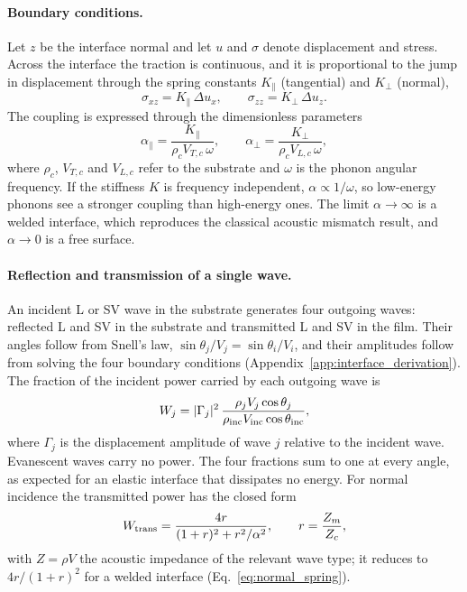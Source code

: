 \paragraph{Boundary conditions.}
Let $z$ be the interface normal and let $u$ and $\sigma$ denote displacement and stress.
Across the interface the traction is continuous, and it is proportional to the jump in
displacement through the spring constants $K_\parallel$ (tangential) and $K_\perp$ (normal),
\begin{equation}
  \sigma_{xz}=K_\parallel\,\Delta u_x,\qquad \sigma_{zz}=K_\perp\,\Delta u_z .
\end{equation}
The coupling is expressed through the dimensionless parameters
\begin{equation}
  \alpha_\parallel=\frac{K_\parallel}{\rho_cV_{T,c}\,\omega},\qquad
  \alpha_\perp=\frac{K_\perp}{\rho_cV_{L,c}\,\omega},
  \label{eq:alpha_omega}
\end{equation}
where $\rho_c$, $V_{T,c}$ and $V_{L,c}$ refer to the substrate and $\omega$ is the phonon
angular frequency. If the stiffness $K$ is frequency independent, $\alpha\propto1/\omega$,
so low-energy phonons see a stronger coupling than high-energy ones. The limit
$\alpha\to\infty$ is a welded interface, which reproduces the classical acoustic mismatch
result, and $\alpha\to0$ is a free surface.

\paragraph{Reflection and transmission of a single wave.}
An incident L or SV wave in the substrate generates four outgoing waves: reflected L and SV
in the substrate and transmitted L and SV in the film. Their angles follow from Snell's law,
$\sin\theta_j/V_j=\sin\theta_i/V_i$, and their amplitudes follow from solving the four
boundary conditions (Appendix~\ref{app:interface_derivation}). The fraction of the incident
power carried by each outgoing wave is
\begin{equation}
  W_j=|\Gamma_j|^2\,\frac{\rho_jV_j\cos\theta_j}{\rho_{\rm inc}V_{\rm inc}\cos\theta_{\rm inc}},
  \label{eq:power_coeff}
\end{equation}
where $\Gamma_j$ is the displacement amplitude of wave $j$ relative to the incident wave.
Evanescent waves carry no power. The four fractions sum to one at every angle, as expected
for an elastic interface that dissipates no energy. For normal incidence the transmitted
power has the closed form
\begin{equation}
  W_{\rm trans}=\frac{4r}{(1+r)^2+r^2/\alpha^2},\qquad r=\frac{Z_m}{Z_c},
  \label{eq:normal_spring_main}
\end{equation}
with $Z=\rho V$ the acoustic impedance of the relevant wave type; it reduces to
$4r/(1+r)^2$ for a welded interface (Eq.~\eqref{eq:normal_spring}).


